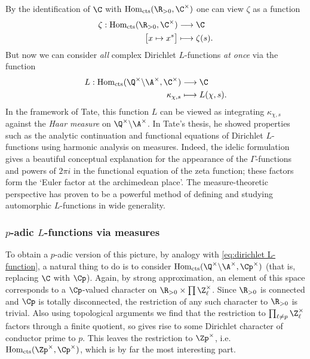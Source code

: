 \documentclass[a4paper,10pt, english, reqno]{smfart}
\newcommand{\Homc}{\mathrm{Hom}_{\mathrm{cts}}}
\numberwithin{equation}{section}
\begin{document}
By the identification of $\C$ with $\Homc(\R_{>0},\C^\times)$ one can view $\zeta$ as a function
\begin{align*}\zeta : \Homc(\R_{>0},\C^\times) &\longrightarrow \C\\
	\big[x \mapsto x^s \big] &\longmapsto \zeta(s).
\end{align*}
But now we can consider \emph{all} complex Dirichlet $L$-functions \emph{at once} via the function
\begin{align} L : \Homc(\Q^\times\backslash\A^\times, \C^\times) &\longrightarrow \C \label{eq:dirichlet L-function}\\
	\kappa_{\chi,s} &\longmapsto L(\chi,s)\notag.
\end{align}
In the framework of Tate, this function $L$ can be viewed as integrating $\kappa_{\chi,s}$ against the \emph{Haar measure} on $\Q^\times\backslash\A^\times$. In Tate's thesis, he showed properties such as the analytic continuation and functional equations of Dirichlet $L$-functions using harmonic analysis on measures. Indeed, the idelic formulation gives a beautiful conceptual explanation for the appearance of the $\Gamma$-functions and powers of $2\pi i$ in the functional equation of the zeta function; these factors form the `Euler factor at the archimedean place'. The measure-theoretic perspective has proven to be a powerful method of defining and studying automorphic $L$-functions in wide generality.






\subsubsection{$p$-adic $L$-functions via measures}

To obtain a $p$-adic version of this picture, by analogy with \eqref{eq:dirichlet L-function}, a natural thing to do is to consider $\Homc(\Q^\times\backslash\A^\times,\Cp^\times)$ (that is, replacing $\C$ with $\Cp$).  Again, by strong approximation, an element of this space corresponds to a $\Cp$-valued character on $\R_{>0} \times \prod \Z_\ell^\times$. Since $\R_{>0}$ is connected and $\Cp$ is totally disconnected, the restriction of any such character to $\R_{>0}$ is trivial. Also using topological arguments we find that the restriction to $\prod_{\ell \neq p}\Z_{\ell}^\times$ factors through a finite quotient, so gives rise to some Dirichlet character of conductor prime to $p$. This leaves the restriction to $\Zp^\times$, i.e.\ $\Homc(\Zp^\times,\Cp^\times)$, which is by far the most interesting part. 
\end{document}
